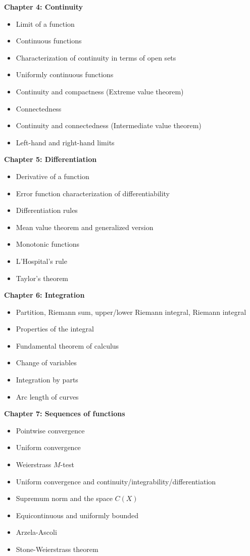 \documentclass[12pt]{article}
\begin{document}
\noindent \textbf{Chapter 4: Continuity}
\begin{itemize}
\item Limit of a function
\item Continuous functions
\item Characterization of continuity in terms of open sets
\item Uniformly continuous functions 
\item Continuity and compactness (Extreme value theorem)
\item Connectedness
\item Continuity and connectedness (Intermediate value theorem)
\item Left-hand and right-hand limits
\end{itemize}

\noindent \textbf{Chapter 5: Differentiation}
\begin{itemize}
\item Derivative of a function
\item Error function characterization of differentiability
\item Differentiation rules
\item Mean value theorem and generalized version
\item Monotonic functions
\item L'Hospital's rule
\item Taylor's theorem
\end{itemize}

\noindent \textbf{Chapter 6: Integration}
\begin{itemize}
\item Partition, Riemann sum, upper/lower Riemann integral, Riemann integral
\item Properties of the integral
\item Fundamental theorem of calculus
\item Change of variables
\item Integration by parts
\item Arc length of curves
\end{itemize}

\noindent \textbf{Chapter 7: Sequences of functions}
\begin{itemize}
\item Pointwise convergence
\item Uniform convergence
\item Weierstrass $M$-test
\item Uniform convergence and continuity/integrability/differentiation
\item Supremum norm and the space $C(X)$
\item Equicontinuous and uniformly bounded
\item Arzela-Ascoli
\item Stone-Weierstrass theorem
\end{itemize}
\end{document}
